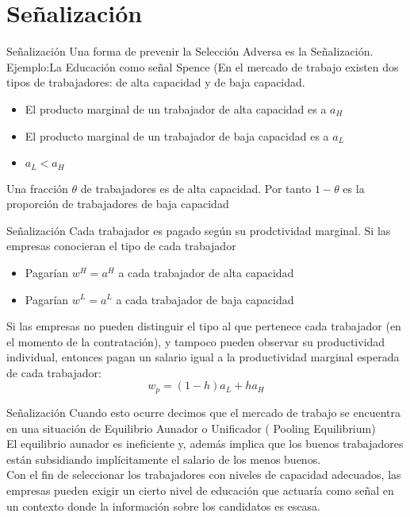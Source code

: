 \section[Señalización]{Señalización}
\begin{frame}{Señalización}
	Una forma de prevenir la Selección Adversa es la Señalización. Ejemplo:La Educación como señal Spence (En el mercado de trabajo existen dos tipos de trabajadores: de alta capacidad y de baja capacidad.
		\begin{itemize}
			\item El producto marginal de un trabajador de alta capacidad es a $a_H$
			\item El producto marginal de un trabajador de baja capacidad es a $a_L$
			\item $a_L < a_H$
		\end{itemize}
	Una fracción $\theta$ de trabajadores es de alta capacidad. Por tanto $1-\theta$ es la proporción de trabajadores de baja capacidad
\end{frame}
\begin{frame}{Señalización}
	Cada trabajador es pagado según su prodctividad marginal. Si las empresas conocieran el tipo de cada trabajador
		\begin{itemize}
			\item Pagarían $w^H = a^H$ a cada trabajador de alta capacidad
			\item Pagarían $w^L = a^L$ a cada trabajador de baja capacidad
		\end{itemize}
	Si las empresas no pueden distinguir el tipo al que pertenece cada trabajador (en el momento de la contratación), y tampoco pueden observar su productividad individual, entonces pagan un salario igual a la productividad marginal esperada de cada trabajador:
		$$w_p = (1-h)a_L + ha_H$$
\end{frame}
\begin{frame}{Señalización}
	Cuando esto ocurre decimos que el mercado de trabajo se encuentra en una situación de Equilibrio Aunador o Unificador ( Pooling Equilibrium)\\[0.3cm]
	El equilibrio aunador es ineficiente y, además implica que los buenos trabajadores están subsidiando implícitamente el salario de los menos buenos.\\[0.3cm]
	Con el fin de seleccionar los trabajadores con niveles de capacidad adecuados, las empresas pueden exigir un cierto nivel de educación que actuaría como señal en un contexto donde la información sobre los candidatos es escasa.
\end{frame}
